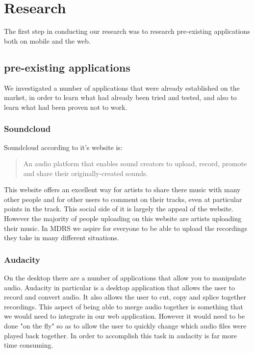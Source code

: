 \documentclass{l3proj}
\begin{document}
\chapter{Research}
\label{Research}

The first step in conducting our research was to research pre-existing applications both on mobile and the web.

\section{pre-existing applications}

We investigated a number of applications that were already established on the market, in order to learn what had already been tried and tested, and also to learn what had been proven not to work.

\subsection{Soundcloud}

Soundcloud according to it's website is:

\blockquote{An audio platform that enables sound creators to upload, record, promote and share their originally-created sounds.}

This website offers an excellent way for artists to share there music with many other people and for other users to comment on their tracks, even at particular points in the track. This social side of it is largely the appeal of the website. However the majority of people uploading on this website are artists uploading their music. In MDRS we aspire for everyone to be able to upload the recordings they take in many different situations.

\subsection{Audacity}

On the desktop there are a number of applications that allow you to manipulate audio. Audacity in particular is a desktop application that allows the user to record and convert audio. It also allows the user to cut, copy and splice together recordings. This aspect of being able to merge audio together is something that we would need to integrate in our web application. However it would need to be done "on the fly" so as to allow the user to quickly change which audio files were played back together. In order to accomplish this task in audacity is far more time consuming.
\end{document}
